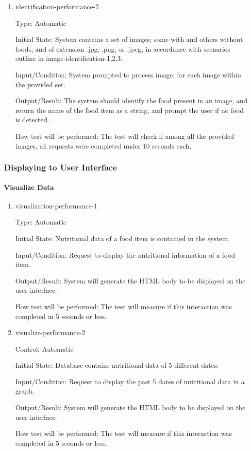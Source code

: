\documentclass[12pt, titlepage]{article}
\begin{document}
\begin{enumerate}
		\item{identification-performance-2\\}
		
		Type: Automatic
		
		Initial State: System contains a set of images; some with and others 
		without foods, and of extension .jpg, .png, or 
		.jpeg, in accordance with scenarios outline in 
		image-identification-1,2,3.
		
		Input/Condition: System prompted to process image, for each image 
		within the provided set.
		
		Output/Result: The system should identify the food present in an image, 
		and return the name of the food item as a string, and prompt the user 
		if no food is detected.
		
		How test will be performed: The test will check if among all the 
		provided images, all requests were completed under 10 seconds each.
	\end{enumerate}
	\subsubsection{Displaying to User Interface}
	
	\paragraph{Visualize Data}
	\begin{enumerate}
		\item{visualization-performance-1\\}
		
		Type: Automatic
		
		Initial State: Nutritional data of a food item is contained in the 
		system.
		
		Input/Condition: Request to display the nutritional information of a 
		food item.
		
		Output/Result: System will generate the HTML body to be displayed on 
		the user 
		interface.
		
		How test will be performed: The test will measure if this interaction 
		was completed in 5 seconds or less.
		
		\item{visualize-performance-2\\}
		
		Control: Automatic
		
		Initial State: Database contains nutritional data of 5 different dates.
		
		Input/Condition: Request to display the past 5 dates of nutritional 
		data in a graph.
		
		Output/Result: System will generate the HTML body to be displayed on 
		the user interface.
		
		How test will be performed: The test will measure if this interaction 
		was completed in 5 seconds or less.
		
	\end{enumerate}
	
\end{document}
